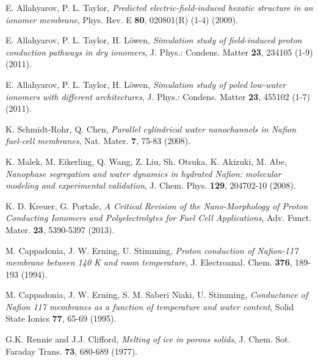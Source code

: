 \documentclass[3p,english,preprint]{elsarticle}
\begin{document}
\begin{thebibliography}{00}
 E. Allahyarov, P.  L. Taylor, 
{\it Predicted electric-field-induced hexatic structure in an ionomer membrane}, 
Phys. Rev. E {\bf 80}, 020801(R) (1-4) (2009). 



E. Allahyarov, P.  L. Taylor, H. L{\"o}wen, 
{\it Simulation study of field-induced proton conduction pathways in  
dry ionomers}, 
J. Phys.: Condens. Matter {\bf 23}, 234105  (1-9)(2011).

E. Allahyarov, P.  L. Taylor, H. L{\"o}wen, 
{\it Simulation study of poled low-water ionomers with different architectures}, 
J. Phys.: Condens. Matter {\bf 23}, 455102 (1-7) (2011).



 K. Schmidt-Rohr,  Q. Chen, 
{\it Parallel cylindrical water nanochannels in Nafion fuel-cell membranes}, 
 Nat. Mater. {\bf 7}, 75-83 (2008).    


K. Malek, M. Eikerling, Q. Wang, Z. Liu, Sh. Otsuka, K. Akizuki, M. Abe, 
{\it Nanophase segregation and water dynamics in hydrated Nafion: molecular
modeling and experimental validation},
J. Chem. Phys. {\bf 129}, 204702-10 (2008).


K. D. Kreuer, G. Portale, 
{\it A Critical Revision of the Nano-Morphology of Proton Conducting Ionomers 
and Polyelectrolytes for Fuel Cell Applications}, 
Adv. Funct. Mater. {\bf 23}, 5390-5397 (2013).



M. Cappadonia, J. W. Erning, U. Stimming, 
{\it   Proton conduction of Nafion-117 membrane between 140 K and room temperature},
J. Electroanal. Chem. {\bf 376}, 189-193 (1994).





M.  Cappadonia, J. W.  Erning, S.  M. Saberi Niaki, U. Stimming, 
{\it Conductance of Nafion 117 membranes as a function of temperature and water content}, 
Solid State Ionics {\bf  77},  65-69 (1995).

 G.K. Rennie and J.J. Clifford, 
{\it Melting of ice in porous solids},
J. Chem. Sot. Faraday Trans. {\bf 73},  680-689 (1977).




\end{thebibliography}
\end{document}
